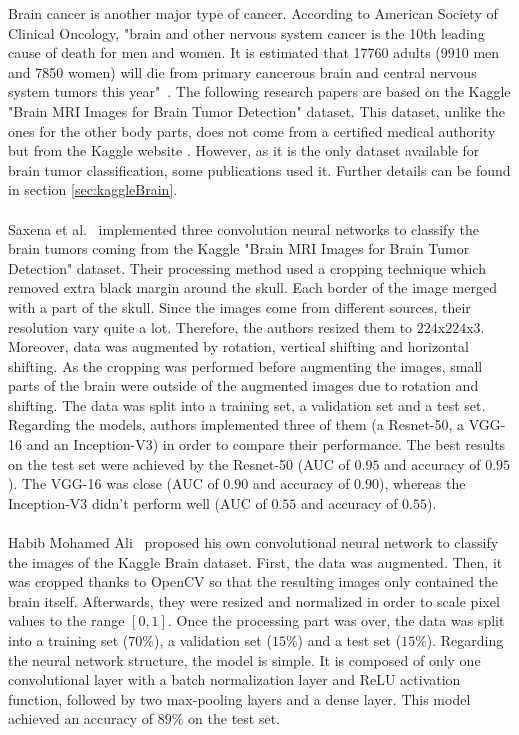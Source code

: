 \setlength{\marginparwidth}{3cm}\leavevmode {}Brain cancer is another major type of cancer. According to American Society of Clinical Oncology, "brain and other nervous system cancer is the 10th leading cause of death for men and women. It is estimated that 17760 adults (9910 men and 7850 women) will die from primary cancerous brain and central nervous system tumors this year"~\cite{43}. The following research papers are based on the Kaggle "Brain MRI Images for Brain Tumor Detection" dataset. This dataset, unlike the ones for the other body parts, does not come from a certified medical authority but from the Kaggle website \cite{45}. However, as it is the only dataset available for brain tumor classification, some publications used it. Further details can be found in section \ref{sec:kaggleBrain}.\\ \\
Saxena et al.~\cite{31} implemented three convolution neural networks to classify the brain tumors coming from the Kaggle "Brain MRI Images for Brain Tumor Detection" dataset. Their processing method used a cropping technique which removed extra black margin around the skull. Each border of the image merged with a part of the skull. Since the images come from different sources, their resolution vary quite a lot. Therefore, the authors resized them to $224$x$224$x$3$. Moreover, data was augmented by rotation, vertical shifting and horizontal shifting. As the cropping was performed before augmenting the images, small parts of the brain were outside of the augmented images due to rotation and shifting. The data was split into a training set, a validation set and a test set. Regarding the models, authors implemented three of them (a Resnet-50, a VGG-16 and an Inception-V3) in order to compare their performance. The best results on the test set were achieved by the Resnet-50 (AUC of $0.95$ and accuracy of $0.95$). The VGG-16 was close (AUC of $0.90$ and accuracy of $0.90$), whereas the Inception-V3 didn't perform well (AUC of $0.55$ and accuracy of $0.55$).\\ \\
Habib Mohamed Ali~\cite{04} proposed his own convolutional neural network to classify the images of the Kaggle Brain dataset. First, the data was augmented. Then, it was cropped thanks to OpenCV so that the resulting images only contained the brain itself. Afterwards, they were resized and normalized in order to scale pixel values to the range $[0,1]$. Once the processing part was over, the data was split into a training set ($70\%$), a validation set ($15\%$) and a test set ($15\%$). Regarding the neural network structure, the model is simple. It is composed of only one convolutional layer with a batch normalization layer and ReLU activation function, followed by two max-pooling layers and a dense layer. This model achieved an accuracy of $89\%$ on the test set.

